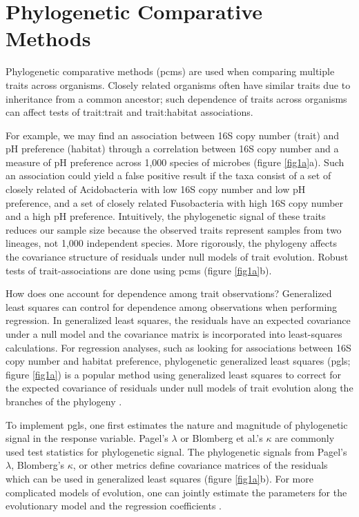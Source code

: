 \section{Phylogenetic Comparative Methods}
Phylogenetic comparative methods (\gls{pcm}s) are used when comparing multiple traits across organisms. Closely related organisms often have similar traits due to inheritance from a common ancestor; such dependence of traits across organisms can affect tests of trait:trait and trait:habitat associations. \par
For example, we may find an association between 16S copy number (trait) and pH preference (habitat) through a correlation between 16S copy number and a measure of pH preference across 1,000 species of microbes (figure \ref{fig1a}a). Such an association could yield a false positive result if the taxa consist of a set of closely related of Acidobacteria with low 16S copy number and low pH preference, and a set of closely related Fusobacteria with high 16S copy number and a high pH preference\cite{variability_16s}. Intuitively, the phylogenetic signal of these traits reduces our sample size because the observed traits represent samples from two lineages, not 1,000 independent species. More rigorously, the phylogeny affects the covariance structure of residuals under null models of trait evolution. Robust tests of trait-associations are done using \gls{pcm}s\cite{grafen_regression} \cite{martins_pcm} (figure \ref{fig1a}b). \par
How does one account for dependence among trait observations? Generalized least squares can control for dependence among observations when performing regression. In generalized least squares, the residuals have an expected covariance under a null model and the covariance matrix is incorporated into least-squares calculations. For regression analyses, such as looking for associations between 16S copy number and habitat preference, phylogenetic generalized least squares\cite{blomberg_pgls} (\gls{pgls}; figure \ref{fig1a}) is a popular method using generalized least squares to correct for the expected covariance of residuals under null models of trait evolution along the branches of the phylogeny \cite{pagel_evolution}. \par
To implement \gls{pgls}, one first estimates the nature and magnitude of phylogenetic signal in the response variable. Pagel's $\lambda$ \cite{pagel_evolution} or Blomberg et al.'s $\kappa$ \cite{blomberg_test} are commonly used test statistics for phylogenetic signal. The phylogenetic signals from Pagel's $\lambda$, Blomberg's $\kappa$, or other metrics define covariance matrices of the residuals which can be used in generalized least squares (figure \ref{fig1a}b). For more complicated models of evolution, one can jointly estimate the parameters for the evolutionary model and the regression coefficients \cite{lavin_morphometrics}.\par
